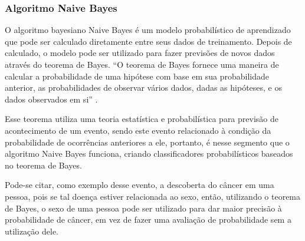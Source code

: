 % 
% 
%  
%  


\subsubsection{Algoritmo Naive Bayes}\label{cap:refTeor:sssec:nbayes}

O algoritmo bayesiano Naive Bayes é um modelo probabilístico de aprendizado que pode ser calculado diretamente entre seus dados de treinamento. Depois de calculado, o modelo pode ser utilizado para fazer previsões de novos dados através do teorema de Bayes. ``O teorema de Bayes fornece uma maneira de calcular a probabilidade de uma hipótese com base em sua probabilidade anterior, as probabilidades de observar vários dados, dadas as hipóteses, e os dados observados em si'' \cite[p. 156]{Mitchell1997}.



Esse teorema utiliza uma teoria estatística e probabilística para previsão de acontecimento de um evento, sendo este evento relacionado à condição da probabilidade de ocorrências anteriores a ele, portanto, é nesse segmento que o algoritmo Naive Bayes funciona, criando classificadores probabilísticos baseados no teorema de Bayes. 


Pode-se citar, como exemplo desse evento, a descoberta do câncer em uma pessoa, pois se tal doença estiver relacionada ao sexo, então, utilizando o teorema de Bayes, o sexo de uma pessoa pode ser utilizado para dar maior precisão à probabilidade de câncer, em vez de fazer uma avaliação de probabilidade sem a utilização dele.

